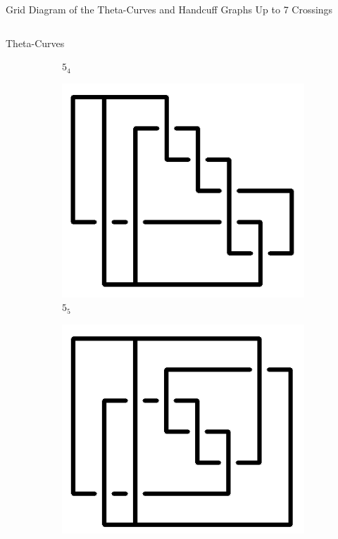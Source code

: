 \documentclass[final]{beamer}
\begin{document}
\begin{frame}[t]
\begin{alertblock}{Grid Diagram of the Theta-Curves and Handcuff Graphs Up to 7 Crossings}
\begin{columns}[t]
\begin{column}{0.5\textwidth}
\begin{alertblock}{Theta-Curves}
\begin{figure}
\begin{subfigure}{0.075\textwidth}
    \caption{$5_4$} 
    \end{subfigure}
    \begin{subfigure}{0.075\textwidth}
    \includegraphics[width=\columnwidth]{../Midterm_Poster/grid_diagram/theta_5_5.png}
    \caption{$5_5$} 
    \end{subfigure}
    \begin{subfigure}{0.075\textwidth}
    \includegraphics[width=\columnwidth]{../Midterm_Poster/grid_diagram/theta_5_6.png}

\end{subfigure}
\end{figure}
\end{alertblock}
\end{column}
\end{columns}
\end{alertblock}
\end{frame}
\end{document}
